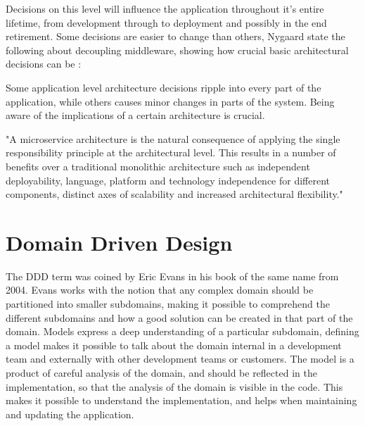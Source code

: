 Decisions on this level will influence the application throughout it's entire lifetime, from development through to deployment and possibly in the end retirement. Some decisions are easier to change than others, Nygaard state the following about decoupling middleware, showing how crucial basic architectural decisions can be \cite[p.~116]{nygard2007release}:


Some application level architecture decisions ripple into every part of the application, while others causes minor changes in parts of the system. Being aware of the implications of a certain architecture is crucial.



"A microservice architecture is the natural consequence of applying the single responsibility principle at the architectural level. This results in a number of benefits over a traditional monolithic architecture such as independent deployability, language, platform and technology independence for different components, distinct axes of scalability and increased architectural flexibility."\cite[p.~3]{fowler2014testing}


\section{Domain Driven Design}
\label{sec:DDD}
The DDD term was coined by Eric Evans in his book of the same name from 2004\cite[preface]{evans2004domain}. Evans works with the notion that any complex domain should be partitioned into smaller subdomains, making it possible to comprehend the different subdomains and how a good solution can be created in that part of the domain. Models express a deep understanding of a particular subdomain, defining a model makes it possible to talk about the domain internal in a development team and externally with other development teams or customers. The model is a product of careful analysis of the domain, and should be reflected in the implementation, so that the analysis of the domain is visible in the code. This makes it possible to understand the implementation, and helps when maintaining and updating the application\cite[p.~2]{evans2004domain}.

